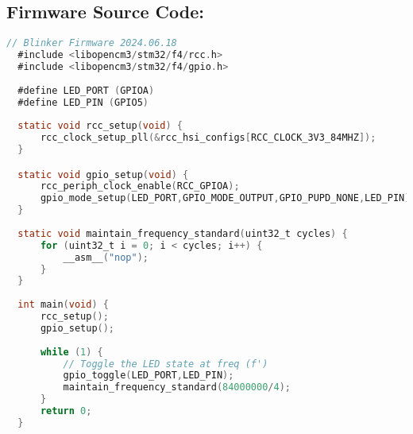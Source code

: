\documentclass[a4paper,12pt]{article}   	%
\begin{document}
\subsection*{Firmware Source Code:}
\begin{lstlisting}[backgroundcolor = \color{beige},
                        language = C,
                        xleftmargin = 1cm,
                        framexleftmargin = 1em]
  // Blinker Firmware 2024.06.18
  #include <libopencm3/stm32/f4/rcc.h>
  #include <libopencm3/stm32/f4/gpio.h>
  
  #define LED_PORT (GPIOA)
  #define LED_PIN (GPIO5)
  
  static void rcc_setup(void) {
      rcc_clock_setup_pll(&rcc_hsi_configs[RCC_CLOCK_3V3_84MHZ]);
  }

  static void gpio_setup(void) {
      rcc_periph_clock_enable(RCC_GPIOA);
      gpio_mode_setup(LED_PORT,GPIO_MODE_OUTPUT,GPIO_PUPD_NONE,LED_PIN);
  }
  
  static void maintain_frequency_standard(uint32_t cycles) {
      for (uint32_t i = 0; i < cycles; i++) {
          __asm__("nop");
      }
  }
  
  int main(void) {
      rcc_setup();
      gpio_setup();
  
      while (1) {
          // Toggle the LED state at freq (f')
          gpio_toggle(LED_PORT,LED_PIN);
          maintain_frequency_standard(84000000/4);
      }
      return 0;
  }


\end{lstlisting}
\end{document}
